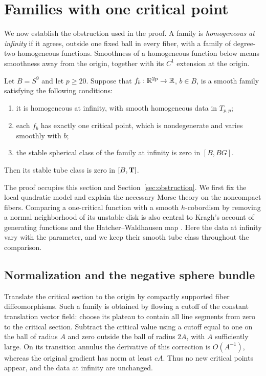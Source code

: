 \section{Families with one critical point}\label{sec:morse}

We now establish the obstruction used in the proof. A family is \emph{homogeneous at infinity} if it agrees, outside one fixed ball in every fiber, with a family of degree-two homogeneous functions. Smoothness of a homogeneous function below means smoothness away from the origin, together with its $C^1$ extension at the origin.

\begin{proposition}\label{prop:one-critical}
Let $B=S^9$ and let $p\geq20$. Suppose that $f_b:\mathbb R^{2p}\to\mathbb R$, $b\in B$, is a smooth family satisfying the following conditions:
\begin{enumerate}
\item it is homogeneous at infinity, with smooth homogeneous data in $T_{p,p}$;
\item each $f_b$ has exactly one critical point, which is nondegenerate and varies smoothly with $b$;
\item the stable spherical class of the family at infinity is zero in $[B,BG]$.
\end{enumerate}
Then its stable tube class is zero in $[B,\mathbf T]$.
\end{proposition}

The proof occupies this section and Section~\ref{sec:obstruction}. We first fix the local quadratic model and explain the necessary Morse theory on the noncompact fibers. Comparing a one-critical function with a smooth $h$-cobordism by removing a normal neighborhood of its unstable disk is also central to Kragh's account of generating functions and the Hatcher--Waldhausen map \cite{Kragh2026}. Here the data at infinity vary with the parameter, and we keep their smooth tube class throughout the comparison.

\subsection{Normalization and the negative sphere bundle}

Translate the critical section to the origin by compactly supported fiber diffeomorphisms. Such a family is obtained by flowing a cutoff of the constant translation vector field: choose its plateau to contain all line segments from zero to the critical section. Subtract the critical value using a cutoff equal to one on the ball of radius $A$ and zero outside the ball of radius $2A$, with $A$ sufficiently large. On its transition annulus the derivative of this correction is $O(A^{-1})$, whereas the original gradient has norm at least $cA$. Thus no new critical points appear, and the data at infinity are unchanged.

